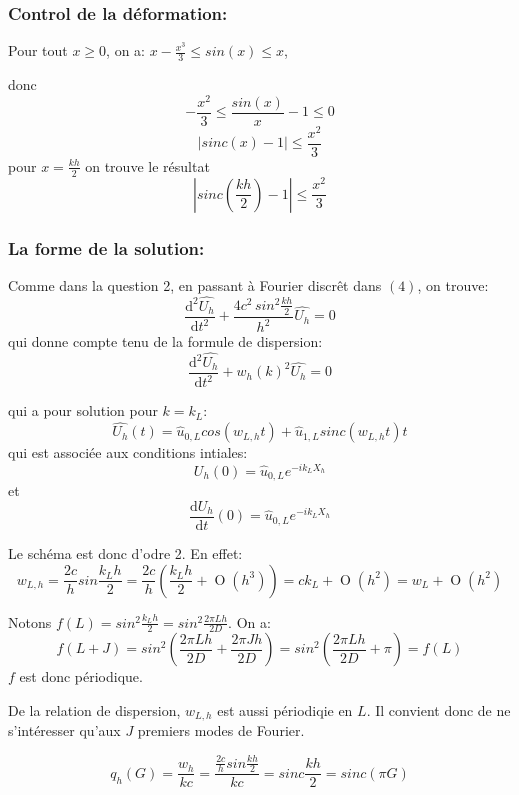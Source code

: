 \documentclass{article}
\newcommand{\BigO}[1]{\ensuremath{\operatorname{O}\left(#1\right)}}
\newcommand{\BigF}[2]{\ensuremath{#1 \left(#2\right)}}
\begin{document}
\subsubsection*{Control de la déformation:}

Pour tout $x \ge 0$, on a: $x - \frac{x^3}{3} \leq sin(x) \leq x$, 

donc $$-\frac{x^2}{3} \leq \frac{sin(x)}{x} - 1 \leq 0 $$
$$ |sinc(x) - 1| \leq \frac{x^2}{3}$$
pour $x = \frac{kh}{2}$ on trouve le résultat $$ |sinc(\frac{kh}{2}) - 1| \leq \frac{x^2}{3}$$

\subsubsection*{La forme de la solution:}
Comme dans la question 2, en passant à Fourier discrêt dans $(4)$, on trouve:
$$ \frac{\mathrm{d}^2 \hat{U_h} } {\mathrm{d}t^2} + \frac{4 c^2 \, sin^2\frac{kh}{2}}{h^2} \hat{U_h} = 0$$
qui donne compte tenu de la formule de dispersion:
$$ \frac{\mathrm{d}^2 \hat{U_h} } {\mathrm{d}t^2} + w_h(k)^2 \hat{U_h} = 0$$

qui a pour solution pour $k = k_L$:
$$ \hat{U_h}(t) = \hat{u}_{0, L} cos(w_{L,h}t) + \hat{u}_{1, L} sinc(w_{L, h} t) t $$
qui est associée aux conditions intiales:
$$ U_h(0) = \hat{u}_{0, L} e^{-ik_L X_h}$$
et 
$$ \frac{\mathrm{d}U_h}{\mathrm{d}t}(0) = \hat{u}_{0, L} e^{-ik_L X_h}$$

Le schéma est donc d'odre 2. En effet:
$$ w_{L,h} = \frac{2c}{h} sin \frac{k_L h}{2} = \frac{2c}{h} \left( \frac{k_L h}{2} + \BigO{h^3} \right) = ck_L + \BigO {h^2} = w_L + \BigO {h^2}$$

Notons $ f(L) = sin^2 \frac{k_L h}{2} = sin^2 \frac{2\pi L h}{2 D}$. On a:
$$ f(L + J) = \BigF{sin^2} {\frac{2\pi L  h}{2 D} + \frac{2\pi J  h}{2 D}} = \BigF{sin^2}{\frac{2\pi L  h}{2 D} + \pi } = f(L) $$
$f$ est donc périodique. 

De la relation de dispersion, $w_{L,h}$ est aussi périodiqie en $L$. Il convient donc de ne s'intéresser qu'aux $J$ premiers modes de Fourier.

$$ q_h(G) = \frac{w_h}{kc} = \frac{ \frac{2c}{h} sin \frac{kh}{2} } {kc}  = sinc \frac{kh}{2} = sinc(\pi G) $$

\begin{center}
\end{center}
\end{document}
